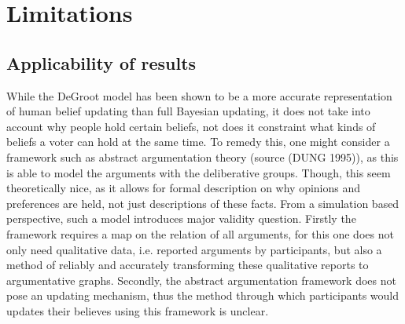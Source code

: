 





\section{Limitations}

\subsection{Applicability of results}

While the DeGroot model has been shown to be a more accurate representation of
human belief updating than full Bayesian updating, it does not take into
account why people hold certain beliefs, not does it constraint what kinds of
beliefs a voter can hold at the same time. To remedy this, one might consider a
framework such as abstract argumentation theory (source (DUNG 1995)), as this
is able to model the arguments with the deliberative groups. Though, this seem
theoretically nice, as it allows for formal description on why opinions and
preferences are held, not just descriptions of these facts. From a simulation
based perspective, such a model introduces major validity question. Firstly the
framework requires a map on the relation of all arguments, for this one does
not only need qualitative data, i.e. reported arguments by participants, but
also a method of reliably and accurately transforming these qualitative reports
to argumentative graphs. Secondly, the abstract argumentation framework does
not pose an updating mechanism, thus the method through which participants
would updates their believes using this framework is unclear.

